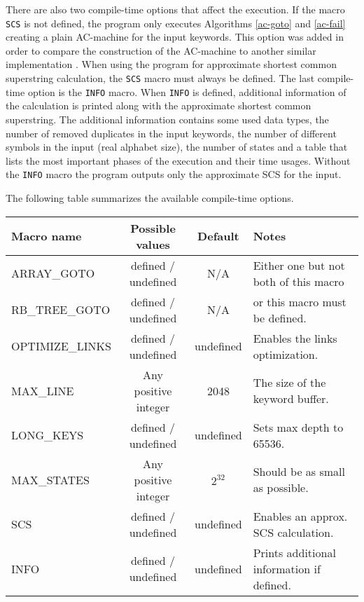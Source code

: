 \documentclass[english,twoside,censored,csm,algorithms-track-2020]{HYthesisML}
\theoremstyle{plain}
\theoremstyle{definition}
\numberwithin{testexample}{chapter}
\begin{document}
There are also two compile-time options that affect the execution. If the macro \texttt{SCS}
is not defined,
the program only executes Algorithms \ref{ac-goto} and \ref{ac-fail} creating a plain AC-machine
for the input keywords. This option was added in order to compare the construction of the
AC-machine to another similar implementation \citep{Salmela06}. When using the program for approximate
shortest common superstring calculation, the \texttt{SCS} macro must always be defined. The last
compile-time option is the \texttt{INFO} macro. When \texttt{INFO} is defined, additional information
of the calculation
is printed along with the approximate shortest common superstring. The additional information contains
some used data types, the number of removed duplicates in the input keywords, the number of different symbols
in the input (real alphabet size), the number of states and a table that lists the most important
phases of the execution and their time usages. Without the \texttt{INFO} macro the program outputs only
the approximate SCS for the input.

The following table summarizes the available compile-time options.\\

\hspace{-0.9cm}
  \begin{tabular}{ |l|c|c|l| }
    \hline
    \textbf{Macro name} & \textbf{Possible values} & \textbf{Default} & \textbf{Notes} \\
 \hline
 ARRAY\_GOTO & defined / undefined & N/A & Either one but not both of this macro \\
 RB\_TREE\_GOTO & defined / undefined & N/A & or this macro must be defined. ~~~ \\
 OPTIMIZE\_LINKS & defined / undefined  & undefined & Enables the links optimization.\\
 MAX\_LINE & Any positive integer & 2048 & The size of the keyword buffer. \\
 LONG\_KEYS & defined / undefined & undefined & Sets max depth to 65536. \\
 MAX\_STATES & Any positive integer & $2^{32}$ & Should be as small as possible. \\
 SCS & defined / undefined & undefined & Enables an approx. SCS calculation. \\
 INFO & defined / undefined & undefined & Prints additional information if defined.\\
 \hline
  \end{tabular}
\end{document}
